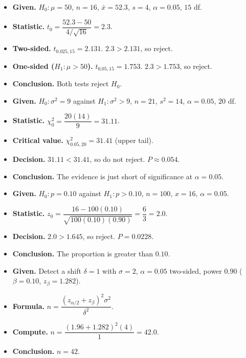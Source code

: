 \begin{example}
\begin{itemize}
  \item \textbf{Given.} $H_0:\mu=50$, $n=16$, $\bar{x}=52.3$, $s=4$, $\alpha=0.05$, $15$ df.
  \item \textbf{Statistic.} $t_0=\dfrac{52.3-50}{4/\sqrt{16}}=2.3$.
  \item \textbf{Two-sided.} $t_{0.025,15}=2.131$. $2.3>2.131$, so reject.
  \item \textbf{One-sided ($H_1:\mu>50$).} $t_{0.05,15}=1.753$. $2.3>1.753$, so reject.
  \item \textbf{Conclusion.} Both tests reject $H_0$.
\end{itemize}
\end{example}

\begin{example}
\begin{itemize}
  \item \textbf{Given.} $H_0:\sigma^2=9$ against $H_1:\sigma^2>9$, $n=21$, $s^2=14$, $\alpha=0.05$, $20$ df.
  \item \textbf{Statistic.} $\chi_0^2=\dfrac{20(14)}{9}=31.11$.
  \item \textbf{Critical value.} $\chi^2_{0.05,20}=31.41$ (upper tail).
  \item \textbf{Decision.} $31.11<31.41$, so do not reject. $P\approx0.054$.
  \item \textbf{Conclusion.} The evidence is just short of significance at $\alpha=0.05$.
\end{itemize}
\end{example}

\begin{example}
\begin{itemize}
  \item \textbf{Given.} $H_0:p=0.10$ against $H_1:p>0.10$, $n=100$, $x=16$, $\alpha=0.05$.
  \item \textbf{Statistic.} $z_0=\dfrac{16-100(0.10)}{\sqrt{100(0.10)(0.90)}}=\dfrac{6}{3}=2.0$.
  \item \textbf{Decision.} $2.0>1.645$, so reject. $P=0.0228$.
  \item \textbf{Conclusion.} The proportion is greater than $0.10$.
\end{itemize}
\end{example}

\begin{example}
\begin{itemize}
  \item \textbf{Given.} Detect a shift $\delta=1$ with $\sigma=2$, $\alpha=0.05$ two-sided, power $0.90$ ($\beta=0.10$, $z_\beta=1.282$).
  \item \textbf{Formula.} $n=\dfrac{(z_{\alpha/2}+z_\beta)^2\sigma^2}{\delta^2}$.
  \item \textbf{Compute.} $n=\dfrac{(1.96+1.282)^2(4)}{1}=42.0$.
  \item \textbf{Conclusion.} $n=42$.
\end{itemize}
\end{example}

